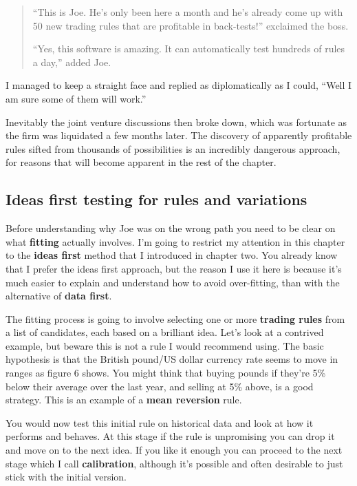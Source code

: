 \begin{quote}
``This is Joe. He's only been here a month and he's already come up with 50 new trading rules that are profitable in back-tests!'' exclaimed the boss. 

``Yes, this software is amazing. It can automatically test hundreds of rules a day,'' added Joe.
\end{quote}

I managed to keep a straight face and replied as diplomatically as I could, ``Well I am sure some of them will work.''

Inevitably the joint venture discussions then broke down, which was fortunate as the firm was liquidated a few months later. The discovery of apparently profitable rules sifted from thousands of possibilities is an incredibly dangerous approach, for reasons that will become apparent in the rest of the chapter.

\subsection*{Ideas first testing for rules and variations}

Before understanding why Joe was on the wrong path you need to be clear on what \textbf{fitting} actually involves. I'm going to restrict my attention in this chapter to the \textbf{ideas first} method that I introduced in chapter two. You already know that I prefer the ideas first approach, but the reason I use it here is because it's much easier to explain and understand how to avoid over-fitting, than with the alternative of \textbf{data first}.

The fitting process is going to involve selecting one or more \textbf{trading rules} from a list of candidates, each based on a brilliant idea. Let's look at a contrived example, but beware this is not a rule I would recommend using. The basic hypothesis is that the British pound/US dollar currency rate seems to move in ranges as figure 6 shows. You might think that buying pounds if they're 5\% below their average over the last year, and selling at 5\% above, is a good strategy. This is an example of a \textbf{mean reversion} rule.

You would now test this initial rule on historical data and look at how it performs and behaves. At this stage if the rule is unpromising you can drop it and move on to the next idea. If you like it enough you can proceed to the next stage which I call \textbf{calibration}, although it's possible and often desirable to just stick with the initial version.

